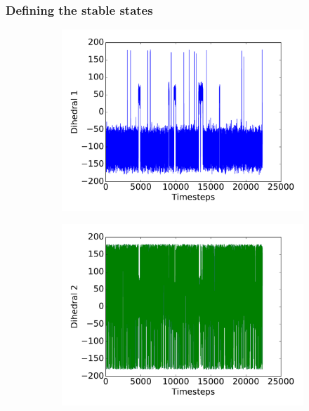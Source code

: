 \documentclass[hyperref={pdfpagelabels=false}]{beamer}
\begin{document}
\begin{frame}
\frametitle{Defining the stable states} 
\begin{figure}[t!]
    \begin{subfigure}[t]{0.5\textwidth}
        \includegraphics[width=\textwidth]{images/C_Dihedral1.pdf}
    \end{subfigure}%
    \begin{subfigure}[t]{0.5\textwidth}
        \includegraphics[width=\textwidth]{images/C_Dihedral2.pdf}
    \end{subfigure}
\end{figure}
\end{frame}
\end{document}

